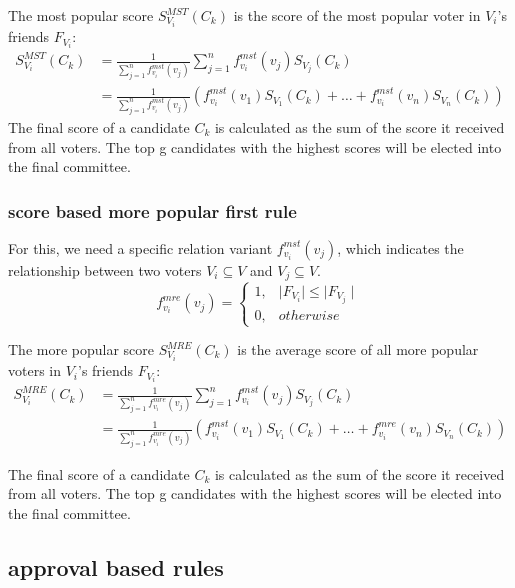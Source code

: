 \documentclass[
   a4paper,                      %
   tucfont,                      %
   english,                      %
   tuctitle,                     %
   intoc,                        %
   twoside,                      %
   captions=tableheading,        %
   openright,                    %
   final,                        %
   ]{tuc-thesis}                 %
\begin{document}
The most popular score $S_{V_i}^{MST}(C_k)$ is the score of the most popular voter in $V_i$'s friends $F_{V_i}$:
\begin{equation}
\begin{split}
S_{V_i}^{MST}(C_k) &= \frac{1}{\sum_{j=1}^{n} f_{v_i}^{mst}(v_j)}\sum_{j=1}^{n} f_{v_i}^{mst}(v_j)S_{V_j}(C_k) \\
            &= \frac{1}{\sum_{j=1}^{n} f_{v_i}^{mst}(v_j)}(f_{v_i}^{mst}(v_1)S_{V_1}(C_k) + \dots + f_{v_i}^{mst}(v_n)S_{V_n}(C_k))\label{SB:MST_singlevoter_Score}
\end{split}
\end{equation}
The final score of a candidate $C_k$ is calculated as the sum of the score it received from all voters. The top g candidates with the highest scores will be elected into the final committee.

\subsubsection{score based more popular first rule}
For this, we need a specific relation variant $f_{v_i}^{mst}(v_j)$, which indicates the relationship between two voters $V_i\subseteq V$ and $V_j\subseteq V$. 
 \begin{equation}
 f_{v_i}^{mre}(v_j) =\begin{cases}
        1, & \mid F_{V_i}\mid\leqslant  \mid F_{V_j} \mid \\
        0, &otherwise
        \end{cases}\label{re:MRE}
\end{equation}

The more popular score $S_{V_i}^{MRE}(C_k)$ is the average score of all more popular voters in $V_i$'s friends $F_{V_i}$:
\begin{equation}
\begin{split}
S_{V_i}^{MRE}(C_k) &= \frac{1}{\sum_{j=1}^{n} f_{v_i}^{mre}(v_j)}\sum_{j=1}^{n} f_{v_i}^{mst}(v_j)S_{V_j}(C_k) \\
            &= \frac{1}{\sum_{j=1}^{n} f_{v_i}^{mre}(v_j)}(f_{v_i}^{mst}(v_1)S_{V_1}(C_k) + \dots + f_{v_i}^{mre}(v_n)S_{V_n}(C_k))\label{SB:MRE_singlevoter_Score}
\end{split}
\end{equation}

The final score of a candidate $C_k$ is calculated as the sum of the score it received from all voters. The top g candidates with the highest scores will be elected into the final committee.
\subsection{approval based rules}
\end{document}

